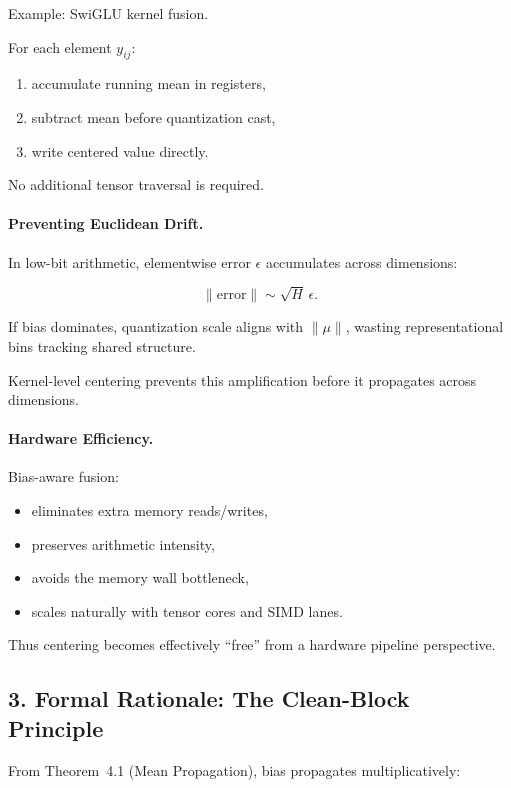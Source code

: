 Example: SwiGLU kernel fusion.

For each element $y_{ij}$:
\begin{enumerate}
\item accumulate running mean in registers,
\item subtract mean before quantization cast,
\item write centered value directly.
\end{enumerate}

No additional tensor traversal is required.

\paragraph{Preventing Euclidean Drift.}

In low-bit arithmetic,
elementwise error $\epsilon$ accumulates across dimensions:

\[
\|\text{error}\| \sim \sqrt{H}\,\epsilon.
\]

If bias dominates,
quantization scale aligns with $\|\mu\|$,
wasting representational bins tracking shared structure.

Kernel-level centering prevents this amplification
before it propagates across dimensions.

\paragraph{Hardware Efficiency.}

Bias-aware fusion:
\begin{itemize}
\item eliminates extra memory reads/writes,
\item preserves arithmetic intensity,
\item avoids the memory wall bottleneck,
\item scales naturally with tensor cores and SIMD lanes.
\end{itemize}

Thus centering becomes effectively ``free''
from a hardware pipeline perspective.

\subsection{3. Formal Rationale: The Clean-Block Principle}
\label{subsec:clean_block}

From Theorem~4.1 (Mean Propagation),
bias propagates multiplicatively:

